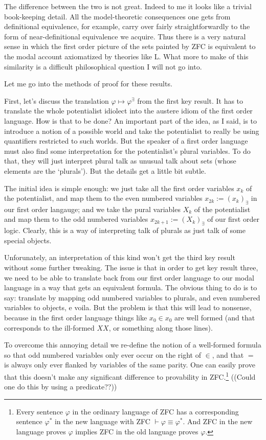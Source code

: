 \documentclass{article}
\begin{document}
The difference between the two is not great. 
Indeed to me it looks like a trivial book-keeping detail. 
All the model-theoretic consequences one gets 
from definitional equivalence, for example, carry over fairly straightforwardly to the form of 
near-definitional equivalence we acquire. Thus there is a very natural sense in which the first order 
picture of the sets painted by ZFC is equivalent to the modal account axiomatized by theories like L. 
What more to make of this similarity is a difficult philosophical question I will not go into.

Let me go into the methods of proof for these results. 

First, let's discuss the translation $\varphi \mapsto \varphi^\exists$ from the first key result.
It has to translate the whole potentialist idiolect into the austere idiom of the 
first order language. How is that to be done? An important part of the idea, as I said, is to introduce a
notion of a possible world and take the potentialist to really be using quantifiers 
restricted to such worlds. But the speaker of a first order language must also 
find some interpretation for the potentialist's plural variables. To do that, 
they will just interpret plural talk as unusual talk about sets (whose elements 
are the `plurals'). But the details get a little bit subtle.

The initial idea is simple enough: we just take all the first order variables $x_k$ of the potentialist, and 
map them to the even numbered variables $x_{2k} := (x_k)_\exists$ in our first order langauge; 
and we take the pural variables $X_k$ of the 
potentialist and map them to the odd numbered variables $x_{2k+1} := (X_k)_\exists$ 
of our first order logic. Clearly, this is a way of interpreting talk of 
plurals as just talk of some special objects.

Unforunately, an interpretation of this kind won't get the third key result 
without some further tweaking. The issue is that in order to get key result three, 
we need to be able to translate back from our first order language to 
our modal language in a way that gets an equivalent formula. The obvious thing to do 
is to say: translate by mapping odd numbered variables to plurals, and even numbered 
variables to objects, e voila. But the problem is that this will lead to nonsense, 
because in the first order language things like $x_0 \in x_0$ are well formed (and that 
corresponds to the ill-formed $XX$, or something along those lines).

To overcome this annoying detail  we re-define the notion 
of a well-formed formula so that odd numbered variables only ever occur on the right of $\in$, 
and that $=$ is always only ever flanked by variables of the same parity. One can easily prove that this doesn't make any significant difference to 
provability in ZFC.\footnote{Every sentence $\varphi$ in the ordinary language of ZFC has 
a corresponding sentence $\varphi^*$ in the new language with ZFC 
$\vdash \varphi \equiv \varphi^*.$ And ZFC in the new language proves $\varphi$ 
implies ZFC in the old language proves $\varphi$.} ((Could one do this by using a predicate??))
\end{document}

